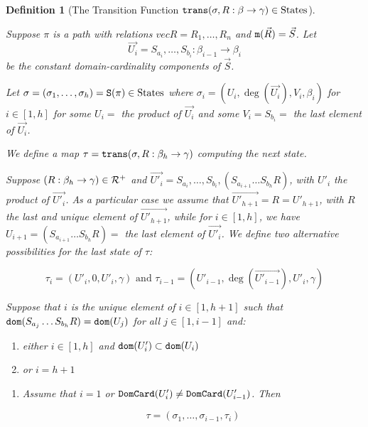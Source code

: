 \documentclass{lmcs}
\newtheorem{definition}[theorem]{Definition}
\begin{document}
\begin{definition}
[The Transition Function ${\tt trans}(\sigma,R : \beta \rightarrow \gamma) \in {{\rm States}}$]
\label{definition-transition-state}

Suppose $\pi$ is a path with relations $vec{R}=R_1, \ldots, R_n$ and
${\tt m}(\vec{R}) = \vec{S}$. Let 
$$\vec{U_i} = S_{a_i}, \ldots, S_{b_i}:\beta_{i-1} \rightarrow \beta_i$$
be the constant domain-cardinality components of $\vec{S}$.

Let $\sigma = (\sigma_1, \ldots, \sigma_h) = {\tt S}(\pi) \in {{\rm States}}$  where 
$\sigma_i = (U_i, \deg(\vec{U_i}),V_i,\beta_i)$ for $i \in [1,h]$ for some
 $U_i = $ the product of $\vec{U_i}$ and some $V_i = S_{b_i} = $
 the last element of $\vec{U_i}$.
 
We define a map $\tau = {\tt trans}(\sigma,R:\beta_h \rightarrow \gamma)$
computing the next state.
 
Suppose $(R:\beta_h \rightarrow \gamma) \in {\mathcal R}^+$
and $\vec{U'_i} = S_{a_i}, \ldots, S_{b_i}, (S_{a_{i+1}} \ldots S_{b_h} R)$, 
with $U'_i$ the product of $\vec{U'_i}$.
As a particular case we assume that $\vec{U'_{h+1}} = R = U'_{h+1}$,
with $R$ the last and unique element of $\vec{U'_{h+1}}$, while for $i \in [1,h]$, we have 
$U_{i+1} = (S_{a_{i+1}} \ldots S_{b_h} R) = $ the last element of $\vec{U'_i}$.
We define two alternative possibilities for the last state of $\tau$:

$$
\tau_i = 
(U'_i, 0, U'_i, \gamma) 
\mbox{ \ \ \ and \ \ \ }
\tau_{i-1} = 
(U'_{i-1}, \deg(\vec{U'_{i-1}}), U'_{i}, \gamma) 
$$

Suppose that $i$ is the unique element of $i \in [1,h+1]$ such that
${\tt dom}(S_{a_j} \ldots S_{b_h} R) = {\tt dom}(U_j)$ for all $j \in [1,i-1]$ and:

\begin{enumerate} 
\item
either $i \in [1,h]$ and ${\tt dom}(U'_i) \subset {\tt dom}(U_i)$
\item 
or $i=h+1$
\end{enumerate}



\begin{enumerate}

\item 
\emph{Assume that $i=1$ or ${\tt DomCard}(U'_i) \not = {\tt DomCard}(U'_{i-1})$}.
Then 

$$
\tau 
= 
(\sigma_1, \ldots, \sigma_{i-1}, \tau_i)
$$



\end{enumerate}
\end{definition}
\end{document}

